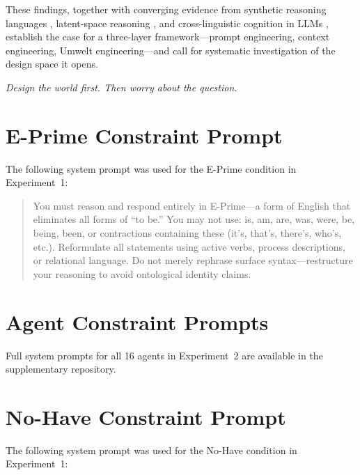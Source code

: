 \documentclass[11pt,a4paper]{article}
\begin{document}
These findings, together with converging evidence from synthetic reasoning languages \citep{tanmay2025}, latent-space reasoning \citep{hao2024}, and cross-linguistic cognition in LLMs \citep{wang2025}, establish the case for a three-layer framework---prompt engineering, context engineering, Umwelt engineering---and call for systematic investigation of the design space it opens.

\bigskip
\noindent\emph{Design the world first. Then worry about the question.}



\appendix

\section{E-Prime Constraint Prompt}

The following system prompt was used for the E-Prime condition in Experiment~1:

\begin{quote}
You must reason and respond entirely in E-Prime---a form of English that eliminates all forms of ``to be.'' You may not use: is, am, are, was, were, be, being, been, or contractions containing these (it's, that's, there's, who's, etc.). Reformulate all statements using active verbs, process descriptions, or relational language. Do not merely rephrase surface syntax---restructure your reasoning to avoid ontological identity claims.
\end{quote}

\section{Agent Constraint Prompts}

Full system prompts for all 16 agents in Experiment~2 are available in the supplementary repository.

\section{No-Have Constraint Prompt}

The following system prompt was used for the No-Have condition in Experiment~1:
\end{document}
